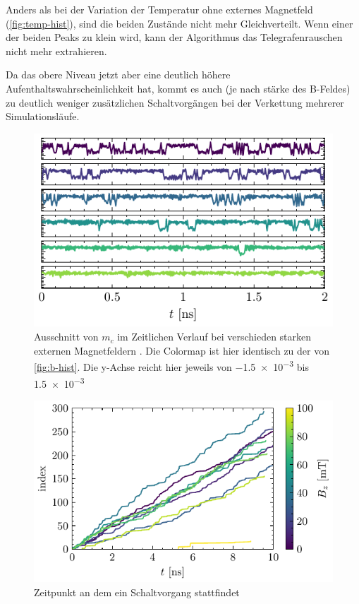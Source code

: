 \documentclass[main.tex]{subfiles}
\begin{document}
Anders als bei der Variation der Temperatur ohne externes Magnetfeld (\cref{fig:temp-hist}), sind die beiden Zustände nicht mehr Gleichverteilt. Wenn einer der beiden Peaks zu klein wird, kann der Algorithmus das Telegrafenrauschen nicht mehr extrahieren. 

Da das obere Niveau jetzt aber eine deutlich höhere Aufenthaltswahrscheinlichkeit hat, kommt es auch (je nach stärke des B-Feldes) zu deutlich weniger zusätzlichen Schaltvorgängen bei der Verkettung mehrerer Simulationsläufe.



\begin{figure}[H]
    \centering
    \includegraphics{bilder/plots/max_Bz/mc_time.pdf}
    \caption{Ausschnitt von \(m_c\) im Zeitlichen Verlauf bei verschieden starken externen Magnetfeldern . Die Colormap ist hier identisch zu der von \cref{fig:b-hist}. Die y-Achse reicht hier jeweils von \num{-1.5e-3} bis \num{+1.5e-3}}\label{fig:b-time}    
\end{figure}

\begin{figure}[H]
    \centering
    \includegraphics{bilder/plots/max_Bz/switch_events.pdf}
    \caption{Zeitpunkt an dem ein Schaltvorgang stattfindet}\label{fig:bz-switch-events}   
\end{figure}
\end{document}
